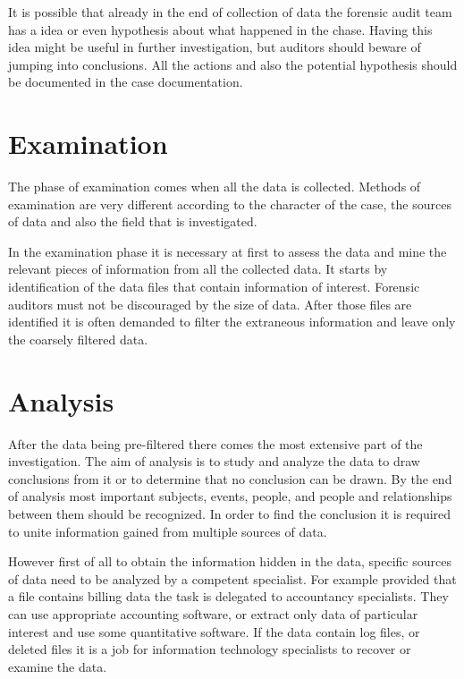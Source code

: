 It is possible that already in the end of collection of data the forensic audit team has a idea or even hypothesis about what happened in the chase. Having this idea might be useful in further investigation, but auditors should beware of jumping into conclusions. All the actions and also the potential hypothesis should be documented in the case documentation. 

\section{Examination}

The phase of examination comes when all the data is collected. Methods of examination are very different according to the character of the case, the sources of data and also the field that is investigated. 

In the examination phase it is necessary at first to assess the data and mine the relevant pieces of information from all the collected data. It starts by identification of the data files that contain information of interest. Forensic auditors must not be discouraged by the size of data. After those files are identified it is often demanded to filter the extraneous information and leave only the coarsely filtered data. 

\section{Analysis}
After the data being pre-filtered there comes the most extensive part of the investigation. The aim of analysis is to study and analyze the data to draw conclusions from it or to determine that no conclusion can be drawn. By the end of analysis most important subjects, events, people, and people and relationships between them should be recognized. In order to find the conclusion it is required to unite information gained from multiple sources of data.

However first of all to obtain the information hidden in the data, specific sources of data need to be analyzed by a competent specialist. For example provided that a file contains billing data the task is delegated to accountancy specialists. They can use appropriate accounting software, or extract only data of particular interest and use some quantitative software. If the data contain log files, or deleted files it is a job for information technology specialists to recover or examine the data. 


